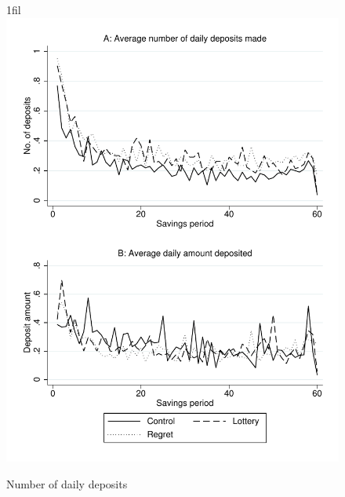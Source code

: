 \documentclass[10pt]{article}
\makeatletter
\newcommand*{\centerfloat}{%
  \parindent \z@
  \leftskip \z@ \@plus 1fil \@minus \textwidth
  \rightskip\leftskip
  \parfillskip \z@skip}
\makeatother
\begin{document}
		\begin{figure}[h]
		\centering
		\caption{Number of daily deposits}
		\centerfloat
		\includegraphics[width=\textwidth]{../../figures/line-deposits.pdf}
		\end{figure}
\end{document}
